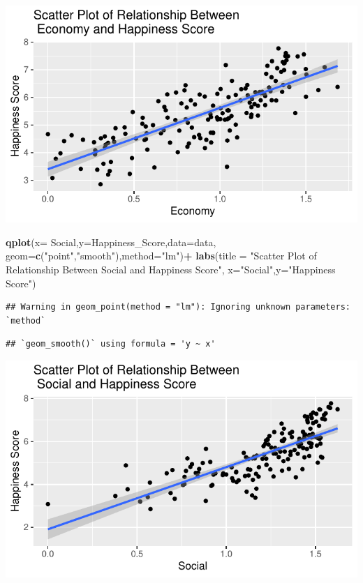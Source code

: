 \documentclass[
  11pt,
]{article}
\newenvironment{Shaded}{\begin{snugshade}}{\end{snugshade}}
\newcommand{\AttributeTok}[1]{\textcolor[rgb]{0.13,0.29,0.53}{#1}}
\newcommand{\FunctionTok}[1]{\textcolor[rgb]{0.13,0.29,0.53}{\textbf{#1}}}
\newcommand{\NormalTok}[1]{#1}
\newcommand{\SpecialCharTok}[1]{\textcolor[rgb]{0.81,0.36,0.00}{\textbf{#1}}}
\newcommand{\StringTok}[1]{\textcolor[rgb]{0.31,0.60,0.02}{#1}}
\begin{document}
\begin{center}\includegraphics[width=0.7\linewidth]{Group_project_2_files/figure-latex/unnamed-chunk-4-1} \end{center}

\begin{Shaded}
\begin{Highlighting}[]
 \FunctionTok{qplot}\NormalTok{(}\AttributeTok{x=}\NormalTok{ Social,}\AttributeTok{y=}\NormalTok{Happiness\_Score,}\AttributeTok{data=}\NormalTok{data,}
 \AttributeTok{geom=}\FunctionTok{c}\NormalTok{(}\StringTok{"point"}\NormalTok{,}\StringTok{"smooth"}\NormalTok{),}\AttributeTok{method=}\StringTok{"lm"}\NormalTok{)}\SpecialCharTok{+}
 \FunctionTok{labs}\NormalTok{(}\AttributeTok{title =}
 \StringTok{"Scatter Plot of Relationship Between}
\StringTok{ Social and Happiness Score"}\NormalTok{,}
 \AttributeTok{x=}\StringTok{"Social"}\NormalTok{,}\AttributeTok{y=}\StringTok{"Happiness Score"}\NormalTok{)}
\end{Highlighting}
\end{Shaded}

\begin{verbatim}
## Warning in geom_point(method = "lm"): Ignoring unknown parameters: `method`
\end{verbatim}

\begin{verbatim}
## `geom_smooth()` using formula = 'y ~ x'
\end{verbatim}

\begin{center}\includegraphics[width=0.7\linewidth]{Group_project_2_files/figure-latex/unnamed-chunk-5-1} \end{center}
\end{document}
